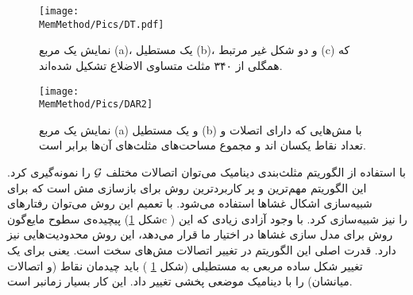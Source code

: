 \begin{figure}[h]
\begin{center}
\texttt{[image: \\MemMethod/Pics/DT.pdf]}
\caption{
نمایش یک مربع (a)، یک مستطیل (b)، و دو شکل غیر مرتبط (c) که همگلی از ۳۴۰ مثلث متساوی الاضلاع تشکیل شده‌اند.
}  
\label{fig:meshDT}
\end{center}
\end{figure} 

\begin{figure}[h]
\begin{center}
\texttt{[image: \\MemMethod/Pics/DAR2]}
\caption{
نمایش یک مربع (a) و یک مستطیل (b) با مش‌هایی که دارای اتصلات و تعداد نقاط یکسان اند و مجموع مساحت‌های مثلث‌های آن‌ها برابر است.
}
\label{fig:meshDAR}
\end{center}
\end{figure} 

با استفاده از الگوریتم مثلث‌بندی دینامیک 
\cite{Boal1992PRA, Gompper1992Science}
می‌توان اتصالات مختلف
 $\cal G$
را نمونه‌گیری کرد. این الگوریتم مهم‌ترین و پر کاربرد‌ترین روش برای بازسازی مش است که برای شبیه‌سازی اشکال غشا‌ها استفاده می‌شود. با تعمیم این روش
\cite{Kohyama2003PRE}
می‌توان رفتارهای پیچیده‌ی سطوح مایع‌گون (شکل 
\ref{fig:meshDT}c
) را نیز شبیه‌سازی کرد. با وجود آزادی زیادی که این روش برای مدل سازی غشا‌ها در اختیار ما قرار می‌دهد، این روش محدودیت‌هایی نیز دارد. قدرت اصلی این الگوریتم در تغییر اتصالات مش‌های سخت است. یعنی برای یک تغییر شکل ساده مربعی به مستطیلی (شکل 
\ref{fig:meshDT}
) باید چیدمان نقاط (و اتصالات میانشان) را با دینامیک موضعی پخشی تغییر داد. این کار بسیار زمانبر است.













